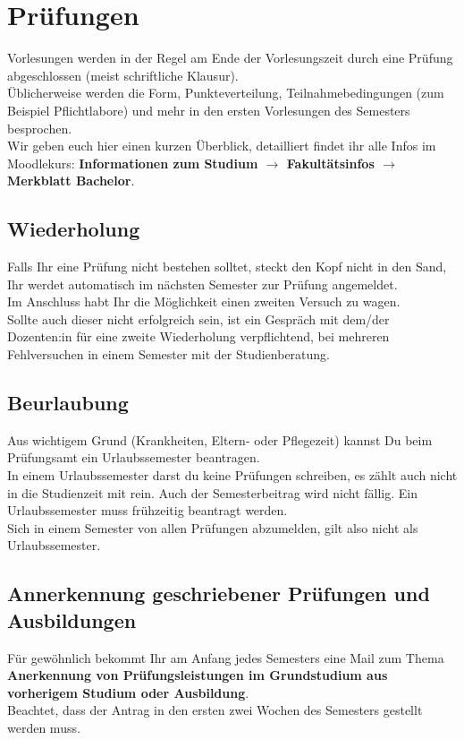 \chapter{Prüfungen}

Vorlesungen werden in der Regel am Ende der Vorlesungszeit durch eine Prüfung abgeschlossen (meist schriftliche Klausur).\\
Üblicherweise werden die Form, Punkteverteilung, Teilnahmebedingungen (zum Beispiel Pflichtlabore) und mehr in den ersten
Vorlesungen des Semesters besprochen.\\

Wir geben euch hier einen kurzen Überblick, detailliert  findet ihr alle Infos im Moodlekurs:
\textbf{Informationen zum Studium \(\rightarrow\) Fakultätsinfos \(\rightarrow\) Merkblatt Bachelor}.\\


\section{Wiederholung}
Falls Ihr eine Prüfung nicht bestehen solltet, steckt den Kopf nicht in den Sand, Ihr werdet automatisch im nächsten Semester zur Prüfung angemeldet.\\
Im Anschluss habt Ihr die Möglichkeit einen zweiten Versuch zu wagen.\\
Sollte auch dieser nicht erfolgreich sein, ist ein Gespräch mit dem/der Dozenten:in für eine zweite Wiederholung verpflichtend, bei mehreren Fehlversuchen
in einem Semester mit der Studienberatung.\\

\section{Beurlaubung}\label{pruef:urlaub}
Aus wichtigem Grund (Krankheiten, Eltern- oder Pflegezeit) kannst Du beim Prüfungsamt ein Urlaubssemester beantragen.\\
In einem Urlaubssemester darst du keine Prüfungen schreiben, es zählt auch nicht in die Studienzeit mit rein.
Auch der Semesterbeitrag wird nicht fällig. 
Ein Urlaubssemester muss frühzeitig beantragt werden.\\
Sich in einem Semester von allen Prüfungen abzumelden, gilt also nicht als Urlaubssemester.\\

\section{Annerkennung geschriebener Prüfungen und Ausbildungen}
Für gewöhnlich bekommt Ihr am Anfang jedes Semesters eine Mail zum Thema
\textbf{Anerkennung von Prüfungsleistungen im Grundstudium aus vorherigem Studium oder Ausbildung}.\\
Beachtet, dass der Antrag in den ersten zwei Wochen des Semesters gestellt werden muss.\\

